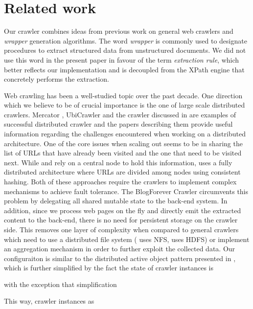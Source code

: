 \section{Related work}
\label{relatedwork}

Our crawler combines ideas from previous work on general web crawlers and \emph{wrapper} generation algorithms. The word \emph{wrapper} is commonly used to designate procedures to extract structured data from unstructured documents. We did not use this word in the present paper in favour of the term \emph{extraction rule}, which better reflects our implementation and is decoupled from the XPath engine that concretely performs the extraction.

Web crawling has been a well-studied topic over the past decade. One direction which we believe to be of crucial importance is the one of large scale distributed crawlers. Mercator \cite{heydon99mercator}, UbiCrawler \cite{boldi2003} and the crawler discussed in \cite{shkapenyuk2002} are examples of successful distributed crawler and the papers describing them provide useful information regarding the challenges encountered when working on a distributed architecture. One of the core issues when scaling out seems to be in sharing the list of URLs that have already been visited and the one that need to be visited next. While \cite{heydon99mercator} and \cite{shkapenyuk2002} rely on a central node to hold this information, \cite{boldi2003} uses a fully distributed architecture where URLs are divided among nodes using consistent hashing. Both of these approaches require the crawlers to implement complex mechanisms to achieve fault tolerance. The BlogForever Crawler circumvents this problem by delegating all shared mutable state to the back-end system. In addition, since we process web pages on the fly and directly emit the extracted content to the back-end, there is no need for persistent storage on the crawler side. This removes one layer of complexity when compared to general crawlers which need to use a distributed file system (\cite{shkapenyuk2002} uses NFS, \cite{berger2011} uses HDFS) or implement an aggregation mechanism in order to further exploit the collected data. Our configuraiton is similar to the distributed active object pattern presented in \cite{activeobject1996}, 
which is further simplified by the fact the state of crawler instances is 


with the exception that simplification

This way, crawler instances as 


